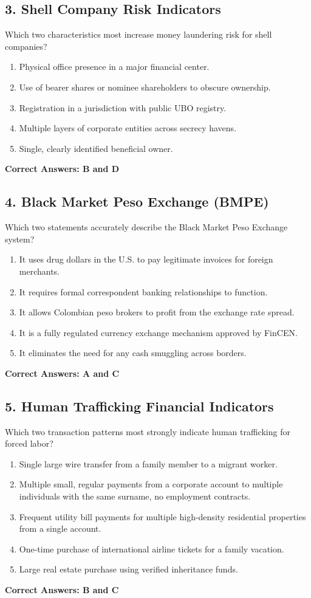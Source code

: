 \documentclass[11pt,a4paper]{article}
\begin{document}
	\subsection{3. Shell Company Risk Indicators}
	Which two characteristics most increase money laundering risk for shell companies?
	\begin{enumerate}[label=\Alph*.]
		\item Physical office presence in a major financial center.
		\item Use of bearer shares or nominee shareholders to obscure ownership.
		\item Registration in a jurisdiction with public UBO registry.
		\item Multiple layers of corporate entities across secrecy havens.
		\item Single, clearly identified beneficial owner.
	\end{enumerate}
	\textbf{Correct Answers: B and D}
	
	\subsection{4. Black Market Peso Exchange (BMPE)}
	Which two statements accurately describe the Black Market Peso Exchange system?
	\begin{enumerate}[label=\Alph*.]
		\item It uses drug dollars in the U.S. to pay legitimate invoices for foreign merchants.
		\item It requires formal correspondent banking relationships to function.
		\item It allows Colombian peso brokers to profit from the exchange rate spread.
		\item It is a fully regulated currency exchange mechanism approved by FinCEN.
		\item It eliminates the need for any cash smuggling across borders.
	\end{enumerate}
	\textbf{Correct Answers: A and C}
	
	\subsection{5. Human Trafficking Financial Indicators}
	Which two transaction patterns most strongly indicate human trafficking for forced labor?
	\begin{enumerate}[label=\Alph*.]
		\item Single large wire transfer from a family member to a migrant worker.
		\item Multiple small, regular payments from a corporate account to multiple individuals with the same surname, no employment contracts.
		\item Frequent utility bill payments for multiple high-density residential properties from a single account.
		\item One-time purchase of international airline tickets for a family vacation.
		\item Large real estate purchase using verified inheritance funds.
	\end{enumerate}
	\textbf{Correct Answers: B and C}
	
\end{document}
